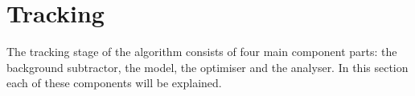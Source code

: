 \pagebreak
\section{Tracking}
\label{sec:tracking}

The tracking stage of the algorithm consists of four main component parts: the background subtractor, the model, the optimiser and the analyser. In this section each of these components will be explained.







